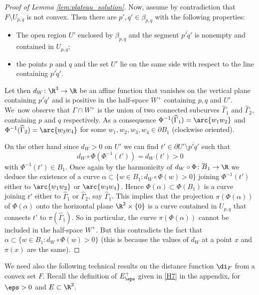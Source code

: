 \begin{proof}[Proof of Lemma \ref{lem:plateau_solution}]
Now, assume by contradiction that $F\setminus U_{p,q}$ is not convex. Then there are $p',q'\in\beta_{p,q}$ with the following properties:
\begin{itemize}
\item The open region $U'$ enclosed by $\beta_{p,q}$ and the segment $\overline{p'q'}$ is nonempty and contained in $U_{p,q}$;
\item the points $p$ and $q$ and the set $U'$ lie on the same side with respect to the line containing $\overline{p'q'}$.
\end{itemize}
Let then $d_W\colon\R^3\to\R$ be an affine function that vanishes on the vertical plane containing $\overline{p'q'}$ and is positive in the half-space $W^+$ containing $p,q$ and $U'$. We~now observe that $\Gamma\cap W^+$ is
the union of two connected subcurves $\widehat\Gamma_1$ and $\widehat\Gamma_2$, containing $p$ and $q$ respectively. As a consequence $\Phi^{-1}(\widehat\Gamma_1)=\arc{w_1w_2}$ and $\Phi^{-1}(\widehat\Gamma_2)=\arc{w_3w_4}$ for some $w_1,w_2,w_3,w_4\in\partial B_1$ (clockwise oriented).

On the other hand since $d_W>0$ on $U'$ we can find $t'\in\partial U'\setminus \overline{p'q'}$ such that
\[
d_W\circ\Phi(\Phi^{-1}(t'))=d_W(t')>0
\]
with $\Phi^{-1}(t')\in B_1$.
Once again by the harmonicity of $d_W\circ\Phi\colon\overline{B}_1\to\R$ we deduce the existence of a curve $\alpha\subset\{w\in B_1\colon d_W\circ\Phi(w)>0\}$ joining $\Phi^{-1}(t')$ either to $\arc{w_1w_2}$ or $\arc{w_3w_4}$. Hence $\Phi(\alpha)\subset \Phi( B_1)$ is a curve joining $t'$ either to $\widehat\Gamma_1$ or $\widehat\Gamma_2$, say $\widehat\Gamma_1$.
This implies that the projection $\pi(\Phi(\alpha))$ of $\Phi(\alpha)$ onto the horizontal plane $\R^2\times\{0\}$ is a curve contained in $U_{p,q}$ that connects $t'$ to $\pi(\widehat\Gamma_1)$. So in particular, the curve $\pi(\Phi(\alpha))$ cannot be included in the half-space $W^+$. But this contradicts the fact that $\alpha\subset\{w\in B_1\colon d_W\circ\Phi(w)>0\}$ (this is because the values of $d_W$ at a point $x$ and~$\pi(x)$ are the same).
\end{proof}

We need also the following technical results on the distance function
$\di_F$ from a convex set $F$.
Recall the definition of $E^+_\eps$ given in \ref{H7} in the appendix,
for $\eps>0$ and $E\subset\R^2$.

